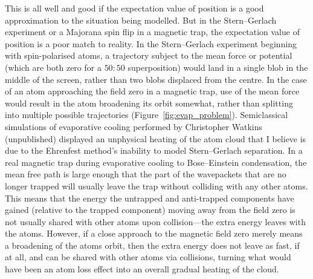 This is all well and good if the expectation value of position is a good approximation to the situation being modelled. But in the Stern--Gerlach experiment or a Majorana spin flip in a magnetic trap, the expectation value of position is a poor match to reality. In the Stern--Gerlach experiment beginning with spin-polarised atoms, a trajectory subject to the mean force or potential (which are both zero for a $50:50$ superposition) would land in a single blob in the middle of the screen, rather than two blobs displaced from the centre. In the case of an atom approaching the field zero in a magnetic trap, use of the mean force would result in the atom broadening its orbit somewhat, rather than splitting into multiple possible trajectories (Figure~\ref{fig:evap_problem}). Semiclassical simulations of evaporative cooling performed by Christopher Watkins (unpublished) displayed an unphysical heating of the atom cloud that I believe is due to the Ehrenfest method's inability to model Stern--Gerlach separation. In a real magnetic trap during evaporative cooling to Bose--Einstein condensation, the mean free path is large enough that the part of the wavepackets that are no longer trapped will usually leave the trap without colliding with any other atoms. This means that the energy the untrapped and anti-trapped components have gained (relative to the trapped component) moving away from the field zero is not usually shared with other atoms upon collision---the extra energy leaves with the atoms. However, if a close approach to the magnetic field zero merely means a broadening of the atoms orbit, then the extra energy does not leave as fast, if at all, and can be shared with other atoms via collisions, turning what would have been an atom loss effect into an overall gradual heating of the cloud. 

